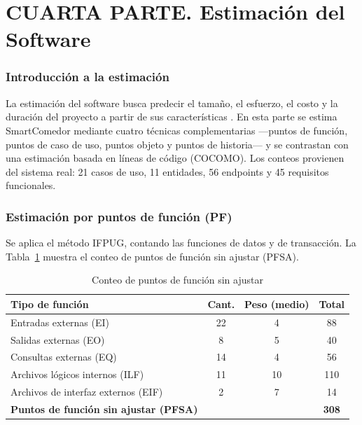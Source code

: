 \part*{CUARTA PARTE. Estimación del Software}

\section{Introducción a la estimación}
La estimación del software busca predecir el tamaño, el esfuerzo, el costo y la
duración del proyecto a partir de sus características \parencite{pressman2014,sommerville2011}.
En esta parte se estima SmartComedor mediante cuatro técnicas complementarias —puntos de
función, puntos de caso de uso, puntos objeto y puntos de historia— y se contrastan con
una estimación basada en líneas de código (COCOMO). Los conteos provienen del sistema
real: 21 casos de uso, 11 entidades, 56 endpoints y 45 requisitos funcionales.

\section{Estimación por puntos de función (PF)}
Se aplica el método IFPUG, contando las funciones de datos y de transacción. La
Tabla~\ref{tab:pf-conteo} muestra el conteo de puntos de función sin ajustar (PFSA).

\begin{table}[H]\centering
\caption{Conteo de puntos de función sin ajustar}\label{tab:pf-conteo}
\begin{tabularx}{\textwidth}{X c c c}
\toprule
\textbf{Tipo de función} & \textbf{Cant.} & \textbf{Peso (medio)} & \textbf{Total} \\
\midrule
Entradas externas (EI) & 22 & 4 & 88 \\
Salidas externas (EO) & 8 & 5 & 40 \\
Consultas externas (EQ) & 14 & 4 & 56 \\
Archivos lógicos internos (ILF) & 11 & 10 & 110 \\
Archivos de interfaz externos (EIF) & 2 & 7 & 14 \\
\midrule
\textbf{Puntos de función sin ajustar (PFSA)} & & & \textbf{308} \\
\bottomrule
\end{tabularx}
\end{table}

